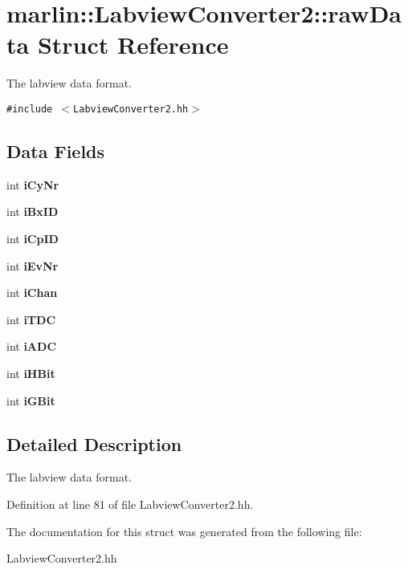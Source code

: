 \section{marlin::Labview\-Converter2::raw\-Data Struct Reference}
\label{structmarlin_1_1LabviewConverter2_1_1rawData}
The labview data format.  


{\tt \#include $<$Labview\-Converter2.hh$>$}

\subsection*{Data Fields}
\begin{CompactItemize}
\item 
int \bf{i\-Cy\-Nr}\label{structmarlin_1_1LabviewConverter2_1_1rawData_348ecb2f38bd810c2c42aadadabdb6d2}

\item 
int \bf{i\-Bx\-ID}\label{structmarlin_1_1LabviewConverter2_1_1rawData_5dbec0e5a5bcf7665a331b9378ae2777}

\item 
int \bf{i\-Cp\-ID}\label{structmarlin_1_1LabviewConverter2_1_1rawData_a032d2168292baf0d207ff172ca096bf}

\item 
int \bf{i\-Ev\-Nr}\label{structmarlin_1_1LabviewConverter2_1_1rawData_2719d6713c32f6792c1bf73a8e3fc10a}

\item 
int \bf{i\-Chan}\label{structmarlin_1_1LabviewConverter2_1_1rawData_1f7b64aab7517b8ce51d77372c9c2fb0}

\item 
int \bf{i\-TDC}\label{structmarlin_1_1LabviewConverter2_1_1rawData_045c70372c18618a590de5da547b5d5a}

\item 
int \bf{i\-ADC}\label{structmarlin_1_1LabviewConverter2_1_1rawData_5e85dc8786687fd029c986cddd14ff47}

\item 
int \bf{i\-HBit}\label{structmarlin_1_1LabviewConverter2_1_1rawData_b16d7aa977d7317ba1b629c4c091d351}

\item 
int \bf{i\-GBit}\label{structmarlin_1_1LabviewConverter2_1_1rawData_648d9fb2f53d0d23b265fc9b87be742b}

\end{CompactItemize}


\subsection{Detailed Description}
The labview data format. 



Definition at line 81 of file Labview\-Converter2.hh.

The documentation for this struct was generated from the following file:\begin{CompactItemize}
\item 
Labview\-Converter2.hh\end{CompactItemize}
